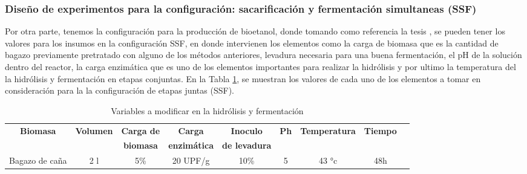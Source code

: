 \documentclass[12pt]{article}
\begin{document}


	
		\subsubsection{Diseño de experimentos para la configuración:
			sacarificación y fermentación simultaneas (SSF)}
		\label{SacariSF}	
		
		
		Por otra parte, tenemos la configuración para la producción de bioetanol, donde tomando como referencia la tesis \cite{Arturo2022evaluacion}, se pueden tener los valores para los insumos en la configuración SSF, en donde intervienen los elementos como la carga de biomasa que es la cantidad de bagazo previamente pretratado con alguno de los métodos anteriores, levadura necesaria para una buena fermentación, el pH de la solución dentro del reactor, la carga enzimática que es uno de los elementos importantes para realizar la hidrólisis y por ultimo la temperatura del la hidrólisis y fermentación en etapas conjuntas. En la Tabla 	\ref{tab:Variables a modificar para la hidrolisis y fermentacion}, se muestran los valores de cada uno de los elementos a tomar en consideración para la la configuración de etapas juntas (SSF). \\[0.5em]
		
		\begin{table} [h!]
			\centering
			\caption{Variables a modificar en la hidrólisis y fermentación}
			\label{tab:Variables a modificar para la hidrolisis y fermentacion}
			\small
			\resizebox{17cm}{!} {
			\begin{tabular}{|c|c|c|c|c|c|c|c|c|}
				\hline
			\textbf{Biomasa}  &\textbf{ Volumen}  & \textbf{Carga de } & \textbf{Carga}  & \textbf{Inoculo}  &\textbf{ Ph}  & \textbf{Temperatura } & \textbf{Tiempo}   \\
				 &   & \textbf{ biomasa}  & \textbf{enzimática } & \textbf{de levadura } & &  &     \\
				
				\hline
			\multirow{2}{*}{Bagazo de caña} &\multirow{2}{*}{2 l}  &\multirow{2}{*}{5\%}  & \multirow{2}{*}{20 UPF/g } & \multirow{2}{*}{10\% } &\multirow{2}{*}{ 5} & \multirow{2}{*}{43 °c} & \multirow{2}{*}{48h }   \\
			  &   & & &  &  & &     \\		
				\hline
			\end{tabular}}
		\end{table}
		
\end{document}
